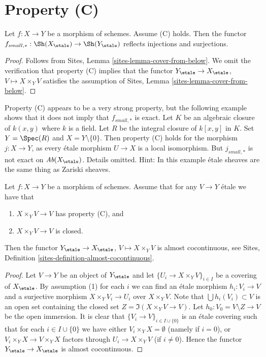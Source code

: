 \section{Property (C)}
\label{section-C}

\begin{lemma}
\label{lemma-property-C-implies}
Let $f : X \to Y$ be a morphism of schemes. Assume (C) holds. Then the functor
$f_{small, *} :
\Sh(X_\etale)
\to
\Sh(Y_\etale)$
reflects injections and surjections.
\end{lemma}

\begin{proof}
Follows from
Sites, Lemma \ref{sites-lemma-cover-from-below}.
We omit the verification that property (C) implies that the functor
$Y_\etale \to X_\etale$, $V \mapsto X \times_Y V$
satisfies the assumption of
Sites, Lemma \ref{sites-lemma-cover-from-below}.
\end{proof}

\begin{remark}
\label{remark-property-C-strong}
Property (C) appears to be a very strong property, but the following
example shows that it does not imply that $f_{small, *}$ is exact.
Let $K$ be an algebraic closure of $k(x, y)$ where $k$ is a field.
Let $R$ be the integral closure of $k[x, y]$ in $K$.
Set $Y = \Spec(R)$ and $X = Y \setminus \{0\}$.
Then property (C) holds for the morphism $j : X \to Y$, as every \'etale
morphism $U \to X$ is a local isomorphism. But $j_{small, *}$ is not exact on
$\textit{Ab}(X_\etale)$. Details omitted. Hint: In this example \'etale
sheaves are the same thing as Zariski sheaves.
\end{remark}

\begin{lemma}
\label{lemma-property-C-closed-implies}
Let $f : X \to Y$ be a morphism of schemes. Assume that
for any $V \to Y$ \'etale we have that
\begin{enumerate}
\item $X \times_Y V \to V$ has property (C), and
\item $X \times_Y V \to V$ is closed.
\end{enumerate}
Then the functor
$Y_\etale \to X_\etale$, $V \mapsto X \times_Y V$
is almost cocontinuous, see
Sites, Definition \ref{sites-definition-almost-cocontinuous}.
\end{lemma}

\begin{proof}
Let $V \to Y$ be an object of $Y_\etale$ and let
$\{U_i \to X \times_Y V\}_{i \in I}$ be a covering of $X_\etale$.
By assumption (1) for each $i$ we can find an \'etale morphism
$h_i : V_i \to V$ and a surjective morphism $X \times_Y V_i \to U_i$
over $X \times_Y V$. Note that $\bigcup h_i(V_i) \subset V$ is an
open set containing the closed set $Z = \Im(X \times_Y V \to V)$.
Let $h_0 : V_0 = V \setminus Z \to V$ be the open immersion.
It is clear that $\{V_i \to V\}_{i \in I \cup \{0\}}$ is an
\'etale covering such that for each $i \in I \cup \{0\}$ we have
either $V_i \times_Y X = \emptyset$ (namely if $i = 0$), or
$V_i \times_Y X \to V \times_Y X$ factors through $U_i \to X \times_Y V$
(if $i \not = 0$). Hence the functor $Y_\etale \to X_\etale$
is almost cocontinuous.
\end{proof}

